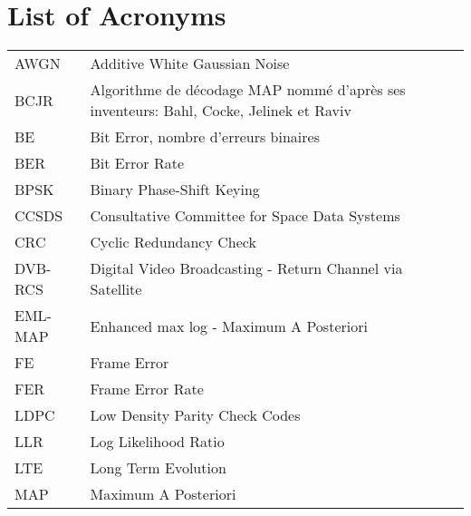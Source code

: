 
\chapter*{List of Acronyms}

\begin{center}
\begin{longtable}{ p{}  p{} }
AWGN        & Additive White Gaussian Noise                                                          \\
BCJR        & Algorithme de décodage MAP nommé d'après ses inventeurs: Bahl, Cocke, Jelinek et Raviv \\
BE          & Bit Error, nombre d'erreurs binaires                                                   \\
BER         & Bit Error Rate                                                                         \\
BPSK        & Binary Phase-Shift Keying                                                              \\
CCSDS       & Consultative Committee for Space Data Systems                                          \\
CRC         & Cyclic Redundancy Check                                                                \\
DVB-RCS     & Digital Video Broadcasting - Return Channel via Satellite                              \\
EML-MAP     & Enhanced max log - Maximum A Posteriori                                                \\
FE          & Frame Error                                                                            \\
FER         & Frame Error Rate                                                                       \\
LDPC        & Low Density Parity Check Codes                                                         \\
LLR         & Log Likelihood Ratio                                                                   \\
LTE         & Long Term Evolution                                                                    \\
MAP         & Maximum A Posteriori                                                                   \\

\end{longtable}
\end{center}
